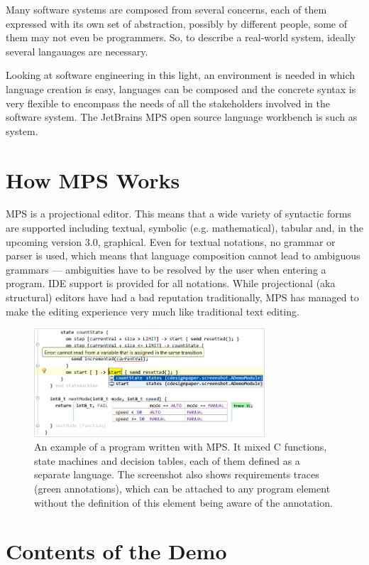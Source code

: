 \documentclass[10pt, conference, compsocconf]{IEEEtran}
\begin{document}
Many software systems are composed from several concerns, each of them expressed
with its own set of abstraction, possibly by different people, some of them may
not even be programmers. So, to describe a real-world system, ideally several
langauages are necessary.

Looking at software engineering in this light, an environment is needed in
which language creation is easy, languages can be composed and the concrete
syntax is very flexible to encompass the needs of all the stakeholders involved
in the software system. The JetBrains MPS open source language workbench is such
as system.

\section{How MPS Works}

\noindent
MPS is a projectional editor. This means that a wide variety of syntactic forms
are supported including textual, symbolic (e.g. mathematical), tabular and, in
the upcoming version 3.0, graphical. Even for textual notations, no grammar or
parser is used, which means that language composition cannot lead to ambiguous
grammars --- ambiguities have to be resolved by the user when entering a
program. IDE support is provided for all notations. While projectional (aka
structural) editors have had a bad reputation traditionally, MPS has managed to
make the editing experience very much like traditional text editing.
 

\begin{figure}[h]  
\includegraphics[width=8.6cm]{figures/screenshot.png}
\caption{An example of a program written with MPS. It mixed C functions,
state machines and decision tables, each of them defined as a separate
language. The screenshot also shows requirements traces (green annotations),
which can be attached to any program element without the definition of this
element being aware of the annotation.}
\end{figure}

\section{Contents of the Demo}
\end{document}
